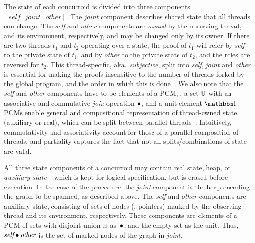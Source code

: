 
The state of each concurroid is divided into three components
$[\mathit{self}~|~\mathit{joint}~|~\mathit{other}]$. The \emph{joint}
component describes shared state that all threads can change. The
\emph{self} and \emph{other} components are \emph{owned} by the
observing thread, and its environment, respectively, and may be
changed only by its owner. If there are two threads $t_1$ and $t_2$
operating over a state, the proof of $t_1$ will refer by \emph{self}
to the private state of $t_1$, and by \emph{other} to the private
state of $t_2$, and the roles are reversed for $t_2$.
This thread-specific, aka.~\emph{subjective}, split into \emph{self},
\emph{joint} and \emph{other} is essential for making the proofs
insensitive to the number of threads forked by the global program, and
the order in which this is done~\cite{LeyWild-Nanevski:POPL13}. We
also note that the \emph{self} and \emph{other} components have to be
elements of a PCM, \ie, a set $\mathbb{U}$ with an associative and
commutative \emph{join} operation $\bullet$, and a unit element $\pcmU$.
%
PCMs enable general and compositional representation of thread-owned
state (auxiliary or real), which can be split between parallel
threads~\cite{LeyWild-Nanevski:POPL13}. Intuitively, commutativity and
associativity account for those of a parallel composition of threads,
and partiality captures the fact that not all splits/combinations of
state are valid.

All three state components of a concurroid may contain real state, \ie
heap, or \emph{auxiliary state}~\cite{Lucas:TR,Owicki-Gries:CACM76},
which is kept for logical specification, but is erased before
execution.
%
In the case of the  procedure, the \emph{joint} component
is the heap encoding the graph to be spanned, as described above.
%
%
The \emph{self} and \emph{other} components are auxiliary state,
consisting of sets of nodes (\ie, pointers) marked by the observing
thread and its environment, respectively. These components are
elements of a PCM of sets with disjoint union $\dotcup$ as~$\bullet$,
and the empty set as the unit. Thus, $\emph{self} \bullet \emph{other}$
is the set of marked nodes of the graph in \emph{joint}.

